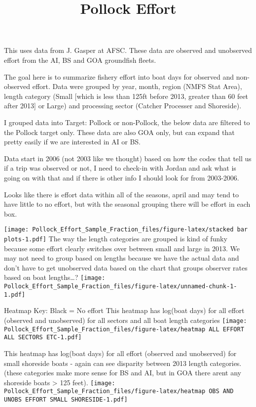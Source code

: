 \documentclass[]{article}
\title{Pollock Effort}
\author{}
\date{\vspace{-2.5em}}
\begin{document}
\maketitle

\n This uses data from J. Gasper at AFSC. These data are observed and
unobserved effort from the AI, BS and GOA groundfish fleets.

\n The goal here is to summarize fishery effort into boat days for
observed and non-observed effort. Data were grouped by year, month,
region (NMFS Stat Area), length category (Small {[}which is less than
125ft before 2013, greater than 60 feet after 2013{]} or Large) and
processing sector (Catcher Processer and Shoreside).

\n I grouped data into Target: Pollock or non-Pollock, the below data
are filtered to the Pollock target only. These data are also GOA only,
but can expand that pretty easily if we are interested in AI or BS.

\n Data start in 2006 (not 2003 like we thought) based on how the codes
that tell us if a trip was observed or not, I need to check-in with
Jordan and ask what is going on with that and if there is other info I
should look for from 2003-2006.

\n Looks like there is effort data within all of the seasons, april and
may tend to have little to no effort, but with the seasonal grouping
there will be effort in each box.

\texttt{[image: Pollock\_Effort\_Sample\_Fraction\_files/figure-latex/stacked bar plots-1.pdf]}
\n The way the length categories are grouped is kind of funky because
some effort clearly switches over between small and large in 2013. \n We
may not need to group based on lengths because we have the actual data
and don't have to get unobserved data based on the chart that groups
observer rates based on boat lengths\ldots{}?
\texttt{[image: Pollock\_Effort\_Sample\_Fraction\_files/figure-latex/unnamed-chunk-1-1.pdf]}

Heatmap Key: Black = No effort This heatmap has log(boat days) for all
effort (observed and unobserved) for all sectors and all boat length
categories
\texttt{[image: Pollock\_Effort\_Sample\_Fraction\_files/figure-latex/heatmap ALL EFFORT ALL SECTORS ETC-1.pdf]}

This heatmap has log(boat days) for all effort (observed and unobserved)
for small shoreside boats - again can see disparity between 2013 length
categories. (these categories make more sense for BS and AI, but in GOA
there arent any shoreside boats \textgreater{} 125 feet).
\texttt{[image: Pollock\_Effort\_Sample\_Fraction\_files/figure-latex/heatmap OBS AND UNOBS EFFORT SMALL SHORESIDE-1.pdf]}
\end{document}
